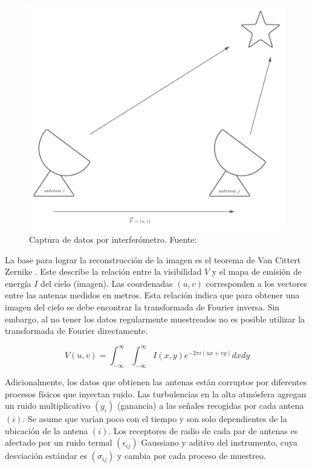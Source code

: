 \begin{figure}[!ht]
	\centering
	\captionsetup{justification=centering}
	\includegraphics[scale=0.6]{images/antenna_star.png}
	\caption[Captura de datos por interferómetro.]{Captura de datos por interferómetro. Fuente: \citep{carcamo2018multi}}
	\label{fig:antenna}
\end{figure}


La base para lograr la reconstrucción de la imagen es el teorema de Van Cittert Zernike \citep{van1934wahrscheinliche}. Este describe la relación entre la visibilidad $V$ y el mapa de emisión de energía $I$ del cielo (imagen). Las coordenadas $(u,v)$ corresponden a los vectores entre las antenas medidos en metros. Esta relación indica que para obtener una imagen del cielo se debe encontrar la transformada de Fourier inversa. Sin embargo, al no tener los datos regularmente muestreados no es posible utilizar la transformada de Fourier directamente.  

\begin{equation}
    V(u, v) = \int_{-\infty}^{\infty}\int_{-\infty}^{\infty}I(x, y)e^{-2\pi i (ux + vy)}dxdy
    \label{eq:cittert-zernike}
\end{equation}

Adicionalmente, los datos que obtienen las antenas están corruptos por diferentes procesos físicos que inyectan ruido. Las turbulencias en la alta atmósfera agregan un ruido multiplicativo $(g_i)$ (ganancia) a las señales recogidas por cada antena $(i)$. Se asume que varían poco con el tiempo y son solo dependientes de la ubicación de la antena $(i)$. Los receptores de radio de cada par de antenas es afectado por un ruido termal $(\epsilon_{ij})$ Gaussiano y aditivo del instrumento, cuya desviación estándar es $(\sigma_{ij})$ y cambia por cada proceso de muestreo.

